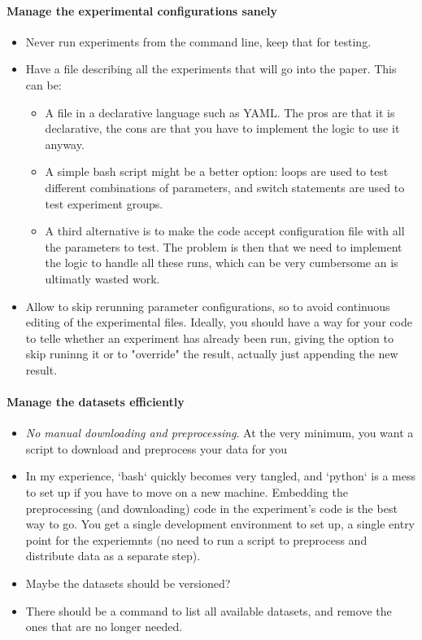 \documentclass{llncs}
\begin{document}
\paragraph{Manage the experimental configurations sanely}

\begin{itemize}
\item Never run experiments from the command line, keep that for testing.
\item Have a file describing all the experiments that will go into the paper. This
  can be:
  \begin{itemize}
  \item A file in a declarative language such as YAML. The pros are that it is
    declarative, the cons are that you have to implement the logic to use it
    anyway.
  \item A simple bash script might be a better option: loops are used to test
      different combinations of parameters, and switch statements are used to
      test experiment groups.
  \item A third alternative is to make the code accept configuration file with all
      the parameters to test. The problem is then that we need to implement the
      logic to handle all these runs, which can be very cumbersome an is
      ultimatly wasted work.
  \end{itemize}
\item Allow to skip rerunning parameter configurations, so to avoid continuous
  editing of the experimental files. Ideally, you should have a way for your
  code to telle whether an experiment has already been run, giving the option
  to skip runinng it or to "override" the result, actually just appending the
  new result.
\end{itemize}

\paragraph{Manage the datasets efficiently}

\begin{itemize}
\item \emph{No manual downloading and preprocessing}. At the very minimum, you want a
  script to download and preprocess your data for you
\item In my experience, `bash` quickly becomes very tangled, and `python` is a mess
  to set up if you have to move on a new machine. Embedding the preprocessing
  (and downloading) code in the experiment's code is the best way to go. You
  get a single development environment to set up, a single entry point for the
  experiemnts (no need to run a script to preprocess and distribute data as a
  separate step).
\item Maybe the datasets should be versioned?
\item There should be a command to list all available datasets, and remove the ones
  that are no longer needed.
\end{itemize}
\end{document}
